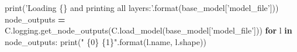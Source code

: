 \documentclass[]{book}
\newenvironment{Shaded}{\begin{snugshade}}{\end{snugshade}}
\newcommand{\KeywordTok}[1]{\textcolor[rgb]{0.13,0.29,0.53}{\textbf{#1}}}
\newcommand{\SpecialCharTok}[1]{\textcolor[rgb]{0.00,0.00,0.00}{#1}}
\newcommand{\StringTok}[1]{\textcolor[rgb]{0.31,0.60,0.02}{#1}}
\newcommand{\ControlFlowTok}[1]{\textcolor[rgb]{0.13,0.29,0.53}{\textbf{#1}}}
\newcommand{\OperatorTok}[1]{\textcolor[rgb]{0.81,0.36,0.00}{\textbf{#1}}}
\newcommand{\BuiltInTok}[1]{#1}
\newcommand{\NormalTok}[1]{#1}
\theoremstyle{definition}
\theoremstyle{definition}
\theoremstyle{definition}
\theoremstyle{remark}
\begin{document}
\begin{Shaded}
\begin{Highlighting}[]
\BuiltInTok{print}\NormalTok{(}\StringTok{'Loading }\SpecialCharTok{\{\}}\StringTok{ and printing all layers:'}\NormalTok{.}\BuiltInTok{format}\NormalTok{(base_model[}\StringTok{'model_file'}\NormalTok{]))}
\NormalTok{node_outputs }\OperatorTok{=}\NormalTok{ C.logging.get_node_outputs(C.load_model(base_model[}\StringTok{'model_file'}\NormalTok{]))}
\ControlFlowTok{for}\NormalTok{ l }\KeywordTok{in}\NormalTok{ node_outputs: }\BuiltInTok{print}\NormalTok{(}\StringTok{"  }\SpecialCharTok{\{0\}}\StringTok{ }\SpecialCharTok{\{1\}}\StringTok{"}\NormalTok{.}\BuiltInTok{format}\NormalTok{(l.name, l.shape))}
\end{Highlighting}
\end{Shaded}
\end{document}
